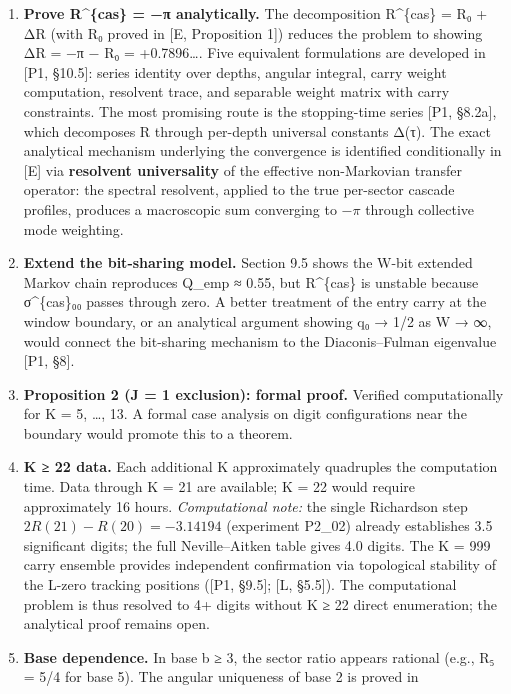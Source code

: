 \documentclass[
  11pt,
]{article}
\begin{document}
\begin{enumerate}
\def\labelenumi{\arabic{enumi}.}
\item
  \textbf{Prove R\^{}\{cas\} = −π analytically.} The decomposition R\^{}\{cas\}
  = R₀ + ΔR (with R₀ proved in {[}E, Proposition 1{]}) reduces the problem to
  showing ΔR = −π − R₀ = +0.7896\ldots. Five equivalent formulations are
  developed in {[}P1, §10.5{]}: series identity over depths, angular integral,
  carry weight computation, resolvent trace, and separable weight matrix with
  carry constraints. The most promising route is the stopping-time series {[}P1,
  §8.2a{]}, which decomposes R through per-depth universal constants Δ(τ). The
  exact analytical mechanism underlying the convergence is identified
  conditionally in {[}E{]} via \textbf{resolvent universality} of the effective
  non-Markovian transfer operator: the spectral resolvent, applied to the true
  per-sector cascade profiles, produces a macroscopic sum converging to \(-\pi\)
  through collective mode weighting.
\item
  \textbf{Extend the bit-sharing model.} Section 9.5 shows the W-bit extended
  Markov chain reproduces Q\_emp ≈ 0.55, but R\^{}\{cas\} is unstable because
  σ\^{}\{cas\}₀₀ passes through zero. A better treatment of the entry carry at
  the window boundary, or an analytical argument showing q₀ → 1/2 as W → ∞,
  would connect the bit-sharing mechanism to the Diaconis--Fulman eigenvalue
  {[}P1, §8{]}.
\item
  \textbf{Proposition 2 (J = 1 exclusion): formal proof.} Verified
  computationally for K = 5, \ldots, 13. A formal case analysis on digit
  configurations near the boundary would promote this to a theorem.
\item
  \textbf{K ≥ 22 data.} Each additional K approximately quadruples the
  computation time. Data through K = 21 are available; K = 22 would require
  approximately 16 hours. \emph{Computational note:} the single Richardson step
  \(2R(21) - R(20) = -3.14194\) (experiment P2\_02) already establishes 3.5
  significant digits; the full Neville--Aitken table gives 4.0 digits. The K =
  999 carry ensemble provides independent confirmation via topological stability
  of the L-zero tracking positions ({[}P1, §9.5{]}; {[}L, §5.5{]}). The
  computational problem is thus resolved to 4+ digits without K ≥ 22 direct
  enumeration; the analytical proof remains open.
\item
  \textbf{Base dependence.} In base b ≥ 3, the sector ratio appears rational
  (e.g., R₅ = 5/4 for base 5). The angular uniqueness of base 2 is proved in

\end{enumerate}
\end{document}
